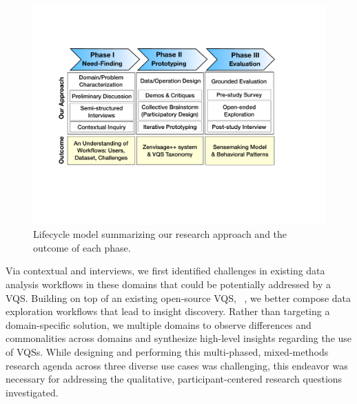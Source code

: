  \begin{figure}
    \centering
    \includegraphics[width=0.95\linewidth]{figures/methodFlowchart.pdf}
    \caption{Lifecycle model summarizing our research approach and the outcome of each phase.}
    \label{methodFlowchart}
    \vspace*{-20pt}
  \end{figure}
 \par {}Via contextual  and interviews, we first identified challenges in existing data analysis workflows in these domains that could be potentially addressed by a VQS. Building on top of an existing open-source VQS, \zv~\cite{Siddiqui2017,Siddiqui2017VLDB}, we  better compose data exploration workflows that lead to insight discovery. Rather than targeting a domain-specific solution, we  multiple domains to observe differences and commonalities across domains and synthesize high-level insights regarding the use of VQSs. While designing and performing this multi-phased, mixed-methods research agenda across three diverse use cases was challenging, this endeavor was necessary for addressing the qualitative, participant-centered research questions investigated.%

